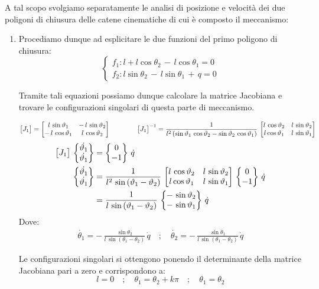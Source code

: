 		A tal scopo svolgiamo separatamente le analisi di posizione e velocità dei due poligoni di chiusura delle catene cinematiche di cui è composto il meccanismo:
		\begin{enumerate}
			\item Procediamo dunque ad esplicitare le due funzioni del primo poligono di chiusura:
			\[
			\begin{cases}
				f_1: l + l\cos{\theta_2}\,-\,l\cos{\theta_1}=0\\
				f_2: l\sin{\theta_2}\,-\,l\sin{\theta_1}\,+\,q=0
			\end{cases}
			\]
			 
			 Tramite tali equazioni possiamo dunque calcolare la matrice Jacobiana e trovare le configurazioni singolari di questa parte di meccanismo.
			 
			 \begin{gather*}
			 \begin{bmatrix}J_1\end{bmatrix} = \begin{bmatrix}l\,\sin{\vartheta_1}&-\,l\,\sin{\vartheta_2}\\-\,l\,\cos{\vartheta_1}& l\,\cos{\vartheta_2}\end{bmatrix}\qquad\qquad \begin{bmatrix}J_1\end{bmatrix}^{-1}= \frac{1}{l^2\,(\sin{\vartheta_1}\,\cos{\vartheta_2}-\sin{\vartheta_2}\,\cos{\vartheta_1})}\,\begin{bmatrix}l\,\cos{\vartheta_2}& l\,\sin{\vartheta_2}\\l \cos{\vartheta_1}&l\,\sin{\vartheta_1}\end{bmatrix}\\
			 \end{gather*}
			 \begin{align*}
			 \begin{bmatrix}J_1\end{bmatrix}\,\begin{Bmatrix}\dot{\vartheta_1}\\\dot{\vartheta_1}\end{Bmatrix}&=\begin{Bmatrix}0\\-1\end{Bmatrix}\,\dot{q}\\
			 \begin{Bmatrix}\dot{\vartheta_1}\\\dot{\vartheta_1}\end{Bmatrix}&=\frac{1}{l^2\,\sin{(\vartheta_1-\vartheta_2)}}\,\begin{bmatrix}l\,\cos{\vartheta_2}& l\,\sin{\vartheta_2}\\l \cos{\vartheta_1}&l\,\sin{\vartheta_1}\end{bmatrix}\,\begin{Bmatrix}0\\-1\end{Bmatrix}\,\dot{q}\\
			 &= \frac{1}{l\,\sin{(\vartheta_1-\vartheta_2)}}\,\begin{Bmatrix}-\,\sin{\vartheta_2}\\-\,\sin{\vartheta_1}\end{Bmatrix}\,\dot{q}
			 \end{align*}
			  Dove:			  
			 \begin{gather*}
			 \dot{\theta_1}= -\,\frac{\sin{\theta_2}}{l\,\sin{(\theta_1-\theta_2)}}\,\dot{q}\quad;\quad \dot{\theta_2}= -\,\frac{\sin{\theta_1}}{l\,\sin{(\theta_1-\theta_2)}}\,\dot{q}
			 \end{gather*}
			 			 \begin{minipage}{.65\textwidth}
			 Le configurazioni singolari si ottengono ponendo il determinante della matrice Jacobiana pari a zero e corrispondono a:
			 \[l=0\quad;\quad \theta_1=\theta_2 + k \pi \quad;\quad\theta_1=\theta_2\]
			 			 

\end{minipage}
\end{enumerate}
